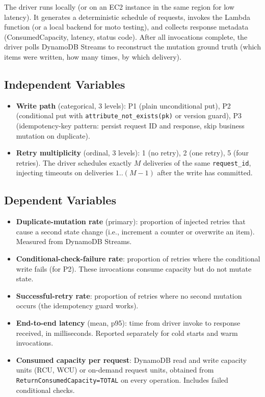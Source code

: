 The driver runs locally (or on an EC2 instance in the same region for low latency). It generates a deterministic schedule of requests, invokes the Lambda function (or a local backend for moto testing), and collects response metadata (ConsumedCapacity, latency, status code). After all invocations complete, the driver polls DynamoDB Streams to reconstruct the mutation ground truth (which items were written, how many times, by which delivery).

\subsection{Independent Variables}

\begin{itemize}
    \item \textbf{Write path} (categorical, 3 levels): P1 (plain unconditional put), P2 (conditional put with \texttt{attribute\_not\_exists(pk)} or version guard), P3 (idempotency-key pattern: persist request ID and response, skip business mutation on duplicate).
    \item \textbf{Retry multiplicity} (ordinal, 3 levels): 1 (no retry), 2 (one retry), 5 (four retries). The driver schedules exactly $M$ deliveries of the same \texttt{request\_id}, injecting timeouts on deliveries $1..(M-1)$ after the write has committed.
\end{itemize}

\subsection{Dependent Variables}

\begin{itemize}
    \item \textbf{Duplicate-mutation rate} (primary): proportion of injected retries that cause a second state change (i.e., increment a counter or overwrite an item). Measured from DynamoDB Streams.
    \item \textbf{Conditional-check-failure rate}: proportion of retries where the conditional write fails (for P2). These invocations consume capacity but do not mutate state.
    \item \textbf{Successful-retry rate}: proportion of retries where no second mutation occurs (the idempotency guard works).
    \item \textbf{End-to-end latency} (mean, p95): time from driver invoke to response received, in milliseconds. Reported separately for cold starts and warm invocations.
    \item \textbf{Consumed capacity per request}: DynamoDB read and write capacity units (RCU, WCU) or on-demand request units, obtained from \texttt{ReturnConsumedCapacity=TOTAL} on every operation. Includes failed conditional checks.
\end{itemize}

